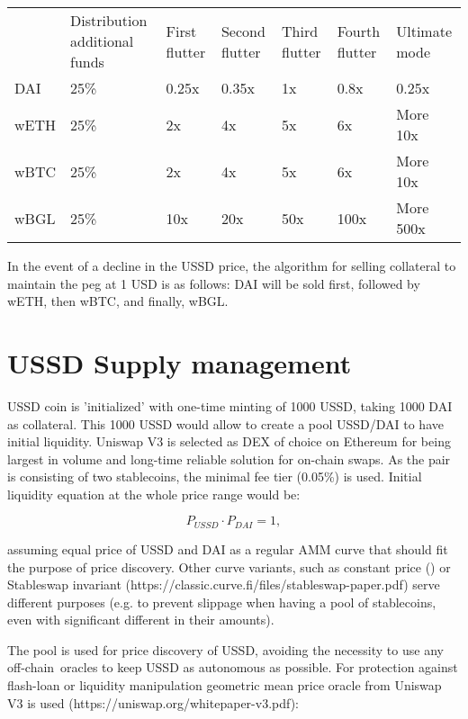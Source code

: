 \begin{table}[]
\begin{tabular}{lllllll}
     & Distribution additional funds & First flutter & Second flutter & Third flutter       & Fourth flutter & Ultimate mode \\
DAI  & 25\%                          & 0.25x         & 0.35x          & 1x & 0.8x           & 0.25x         \\
wETH & 25\%                          & 2x            & 4x             & 5x                  & 6x             & More 10x      \\
wBTC & 25\%                          & 2x            & 4x             & 5x                  & 6x             & More 10x      \\
wBGL & 25\%                          & 10x           & 20x            & 50x                 & 100x           & More 500x    
\end{tabular}
\end{table}

In the event of a decline in the USSD price, the algorithm for selling collateral to maintain 
the peg at 1 USD is as follows: DAI will be sold first, followed by wETH, then wBTC, and finally, wBGL.


\section{USSD Supply management}

USSD coin is 'initialized' with one-time minting of 1000 USSD, taking 1000 DAI as collateral. 
This 1000 USSD would allow to create a pool USSD/DAI to have initial liquidity. Uniswap V3 
is selected as DEX of choice on Ethereum for being largest in volume and long-time reliable 
solution for on-chain swaps. As the pair is consisting of two stablecoins, the minimal fee 
tier (0.05\%) is used. Initial liquidity equation at the whole price range would be:

\[ {P_{USSD} \cdot P_{DAI} = 1}, \]

assuming equal price of USSD and DAI as a regular AMM curve that should fit the purpose 
of price discovery. Other curve variants, such as constant price () or Stableswap invariant 
(https://classic.curve.fi/files/stableswap-paper.pdf) serve different purposes (e.g. to 
prevent slippage when having a pool of stablecoins, even with significant different in 
their amounts).

The pool is used for price discovery of USSD, avoiding the necessity to use any off-chain\
oracles to keep USSD as autonomous as possible. For protection against flash-loan or 
liquidity manipulation geometric mean price oracle from Uniswap V3 is used 
(https://uniswap.org/whitepaper-v3.pdf):

